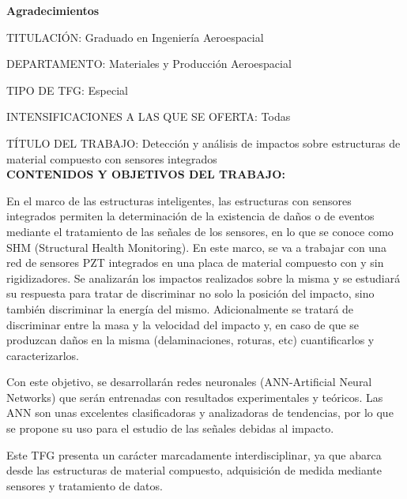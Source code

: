 \textbf{\Huge{Agradecimientos}} \\

\vspace*{10mm}

TITULACIÓN: Graduado en Ingeniería Aeroespacial

DEPARTAMENTO: Materiales y Producción Aeroespacial 

TIPO DE TFG: Especial

INTENSIFICACIONES A LAS QUE SE OFERTA: Todas

TÍTULO DEL TRABAJO: Detección y análisis de impactos sobre estructuras de material compuesto con sensores integrados\\

\textbf{CONTENIDOS Y OBJETIVOS DEL TRABAJO:}

En el marco de las estructuras inteligentes, las estructuras con sensores integrados permiten la determinación de la existencia de daños o de eventos mediante el tratamiento de las señales de los sensores, en lo que se conoce como SHM (Structural Health Monitoring). En este marco, se va a trabajar con una red de sensores PZT integrados en una placa de material compuesto con y sin rigidizadores. Se analizarán los impactos realizados sobre la misma y se estudiará su respuesta para tratar de discriminar no solo la posición del impacto, sino también discriminar la energía del mismo. Adicionalmente se tratará de discriminar entre la masa y la velocidad del impacto y, en caso de que se produzcan daños en la misma (delaminaciones, roturas, etc) cuantificarlos y caracterizarlos. 

Con este objetivo, se desarrollarán redes neuronales (ANN-Artificial Neural Networks) que serán entrenadas con resultados experimentales y teóricos. Las ANN son unas excelentes clasificadoras y analizadoras de tendencias, por lo que se propone su uso para el estudio de las señales debidas al impacto.

Este TFG presenta un carácter marcadamente interdisciplinar, ya que abarca desde las estructuras de material compuesto, adquisición de medida mediante sensores y tratamiento de datos.
